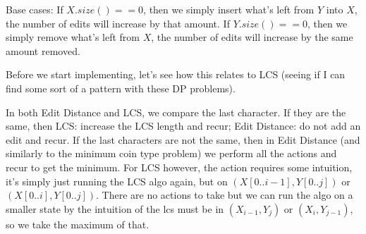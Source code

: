 Base cases: If $X.size()==0$, then we simply insert what's left from $Y$
into $X$, the number of edits will increase by that amount. If
$Y.size()==0$, then we simply remove what's left from $X$, the number of
edits will increase by the same amount removed.

\qasepline{}

Before we start implementing, let's see how this relates to LCS (seeing if I
can find some sort of a pattern with these DP problems).

In both Edit Distance and LCS, we compare the last character. If they are
the same, then LCS: increase the LCS length and recur; Edit Distance: do not
add an edit and recur. If the last characters are not the same, then in Edit
Distance (and similarly to the minimum coin type problem) we perform all the
actions and recur to get the minimum. For LCS however, the action requires
some intuition, it's simply just running the LCS algo again, but on
$(X[0..i-1],Y[0..j])$ or $(X[0..i],Y[0..j])$. There are no actions to take
but we can run the algo on a smaller state by the intuition of the lcs must
be in $(X_{i-1},Y_{j})$ or $(X_{i},Y_{j-1})$, so we take the maximum of
that.

\qasepline{}

